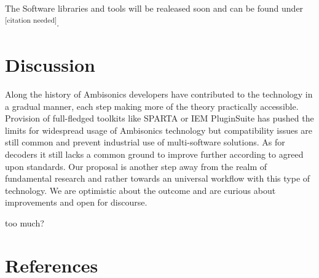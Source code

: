 \documentclass[a4paper, 10pt, twocolumn]{article}
\newcommand{\citationneeded}[1][]{\textsuperscript{\color{black} [citation needed]}}
\begin{document}
The Software libraries and tools will be realeased soon and can be found under \citationneeded{}.


\section{Discussion}\label{sec:Discussion}

Along the history of Ambisonics developers have contributed to the technology in a gradual manner, each step making more of the theory practically accessible. Provision of full-fledged toolkits like SPARTA or IEM PluginSuite has pushed the limits for widespread usage of Ambisonics technology but compatibility issues are still common and prevent industrial use of multi-software solutions. 
As for decoders it still lacks a common ground to improve further according to agreed upon standards. Our proposal is another step away from the realm of fundamental research and rather towards an universal workflow with this type of technology. We are optimistic about the outcome and are curious about improvements and open for discourse.


{\Huge too much?}



\renewcommand\refname{}
\section{References}\label{sec:References}

\begingroup
\RaggedRight 		%

\printbibliography
\endgroup
\end{document}
